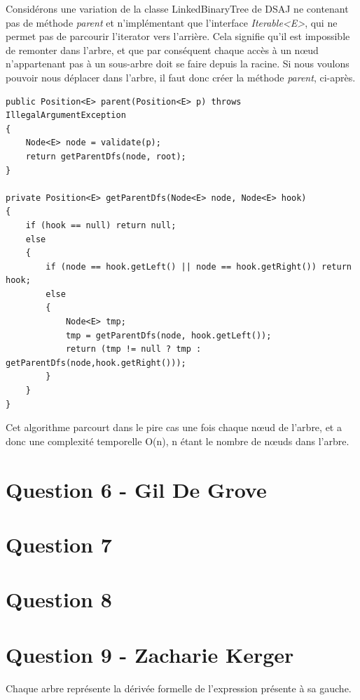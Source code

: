 \documentclass[10pt,a4paper]{article}
\begin{document}
	Considérons une variation de la classe LinkedBinaryTree de DSAJ ne contenant pas de méthode \textit{parent} et n'implémentant que l'interface \textit{Iterable<E>}, qui ne permet pas de parcourir l'iterator vers l'arrière.
	Cela signifie qu'il est impossible de remonter dans l'arbre, et que par conséquent chaque accès à un nœud n'appartenant pas à un sous-arbre doit se faire depuis la racine.
	Si nous voulons pouvoir nous déplacer dans l'arbre, il faut donc créer la méthode \textit{parent}, ci-après.
	
	\begin{lstlisting}
public Position<E> parent(Position<E> p) throws IllegalArgumentException
{
	Node<E> node = validate(p);
	return getParentDfs(node, root);
}

private Position<E> getParentDfs(Node<E> node, Node<E> hook)
{
	if (hook == null) return null;
	else
	{
		if (node == hook.getLeft() || node == hook.getRight()) return hook;
		else
		{
			Node<E> tmp;
			tmp = getParentDfs(node, hook.getLeft());
			return (tmp != null ? tmp : getParentDfs(node,hook.getRight()));
		}
	}
}
	\end{lstlisting}
	
	Cet algorithme parcourt dans le pire cas une fois chaque nœud de l'arbre, et a donc une complexité temporelle O(n), n étant le nombre de nœuds dans l'arbre.

\section*{Question 6 - Gil De Grove}

\section*{Question 7}
\section*{Question 8}
\clearpage
\section*{Question 9 - Zacharie Kerger}

Chaque arbre représente la dérivée formelle de l'expression présente à sa gauche.\\
\end{document}
